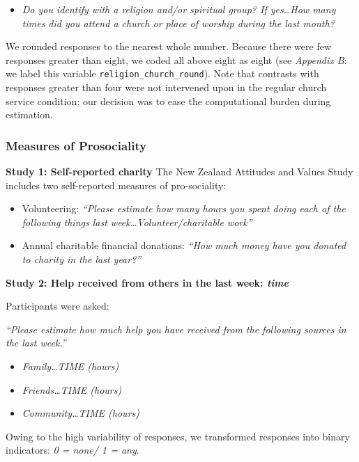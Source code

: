 \documentclass[
  single column]{article}
\providecommand{\tightlist}{%
  \setlength{\itemsep}{0pt}\setlength{\parskip}{0pt}}\usepackage{longtable,booktabs,array}
\begin{document}
\begin{itemize}
\tightlist
\item
  \emph{Do you identify with a religion and/or spiritual group? If
  yes\ldots How many times did you attend a church or place of worship
  during the last month?}
\end{itemize}

We rounded responses to the nearest whole number. Because there were few
responses greater than eight, we coded all above eight as eight (see
\emph{Appendix B}: we label this variable
\texttt{religion\_church\_round}). Note that contrasts with responses
greater than four were not intervened upon in the regular church service
condition; our decision was to ease the computational burden during
estimation.

\subsubsection{Measures of Prosociality}\label{measures-of-prosociality}

\textbf{Study 1: Self-reported charity} The New Zealand Attitudes and
Values Study includes two self-reported measures of pro-sociality:

\begin{itemize}
\item
  Volunteering: \emph{``Please estimate how many hours you spent doing
  each of the following things last week\ldots Volunteer/charitable
  work''}
\item
  Annual charitable financial donations: \emph{``How much money have you
  donated to charity in the last year?''}
\end{itemize}

\textbf{Study 2: Help received from others in the last week: \emph{time}
}

Participants were asked:

\emph{``Please estimate how much help you have received from the
following sources in the last week.''}

\begin{itemize}
\tightlist
\item
  \emph{Family\ldots TIME (hours)}
\item
  \emph{Friends\ldots TIME (hours)}
\item
  \emph{Community\ldots TIME (hours)}
\end{itemize}

Owing to the high variability of responses, we transformed responses
into binary indicators: \emph{0 = none/ 1 = any}.
\end{document}
